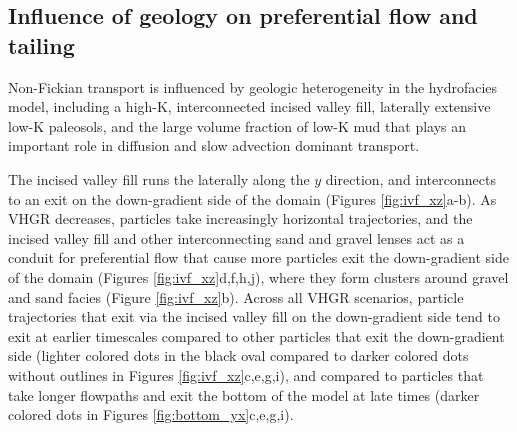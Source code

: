 %
%
\subsection{Influence of geology on preferential flow and tailing}
\label{ss_3_4}

Non-Fickian transport is influenced by geologic heterogeneity in the hydrofacies model, including a high-K, interconnected incised valley fill, laterally extensive low-K paleosols, and the large volume fraction of low-K mud that plays an important role in diffusion and slow advection dominant transport.

The incised valley fill runs the laterally along the $y$ direction, and interconnects to an exit on the down-gradient side of the domain (Figures \ref{fig:ivf_xz}a-b). As VHGR decreases, particles take increasingly horizontal trajectories, and the incised valley fill and other interconnecting sand and gravel lenses act as a conduit for preferential flow that cause more particles exit the down-gradient side of the domain (Figures \ref{fig:ivf_xz}d,f,h,j), where they form clusters around gravel and sand facies (Figure \ref{fig:ivf_xz}b). Across all VHGR scenarios, particle trajectories that exit via the incised valley fill on the down-gradient side tend to exit at earlier timescales compared to other particles that exit the down-gradient side (lighter colored dots in the black oval compared to darker colored dots without outlines in Figures \ref{fig:ivf_xz}c,e,g,i), and compared to particles that take longer flowpaths and exit the bottom of the model at late times (darker colored dots in Figures \ref{fig:bottom_yx}c,e,g,i).


